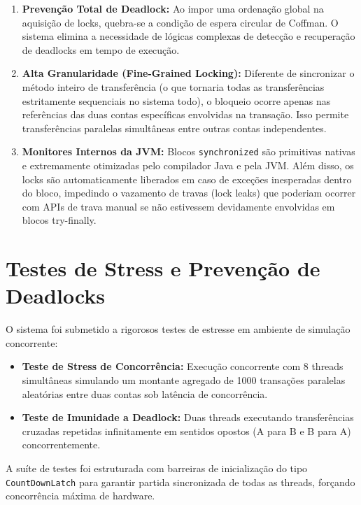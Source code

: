 \documentclass[12pt,a4paper]{article}
\begin{document}
\begin{enumerate}
    \item \textbf{Prevenção Total de Deadlock:} Ao impor uma ordenação global na aquisição de locks, quebra-se a condição de espera circular de Coffman. O sistema elimina a necessidade de lógicas complexas de detecção e recuperação de deadlocks em tempo de execução.
    \item \textbf{Alta Granularidade (Fine-Grained Locking):} Diferente de sincronizar o método inteiro de transferência (o que tornaria todas as transferências estritamente sequenciais no sistema todo), o bloqueio ocorre apenas nas referências das duas contas específicas envolvidas na transação. Isso permite transferências paralelas simultâneas entre outras contas independentes.
    \item \textbf{Monitores Internos da JVM:} Blocos \texttt{synchronized} são primitivas nativas e extremamente otimizadas pelo compilador Java e pela JVM. Além disso, os locks são automaticamente liberados em caso de exceções inesperadas dentro do bloco, impedindo o vazamento de travas (lock leaks) que poderiam ocorrer com APIs de trava manual se não estivessem devidamente envolvidas em blocos try-finally.
\end{enumerate}

\section{Testes de Stress e Prevenção de Deadlocks}

\noindent O sistema foi submetido a rigorosos testes de estresse em ambiente de simulação concorrente:

\begin{itemize}
    \item \textbf{Teste de Stress de Concorrência:} Execução concorrente com 8 threads simultâneas simulando um montante agregado de 1000 transações paralelas aleatórias entre duas contas sob latência de concorrência.
    \item \textbf{Teste de Imunidade a Deadlock:} Duas threads executando transferências cruzadas repetidas infinitamente em sentidos opostos (A para B e B para A) concorrentemente.
\end{itemize}

\noindent A suíte de testes foi estruturada com barreiras de inicialização do tipo \texttt{CountDownLatch} para garantir partida sincronizada de todas as threads, forçando concorrência máxima de hardware.
\end{document}
